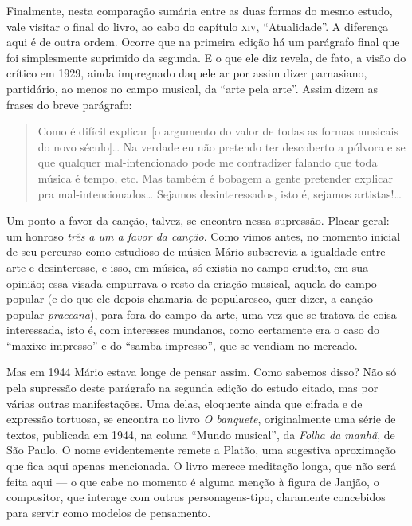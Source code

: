 Finalmente, nesta comparação sumária entre as duas formas do mesmo
estudo, vale visitar o final do livro, ao cabo do capítulo \textsc{xiv},
``Atualidade''. A diferença aqui é de outra ordem. Ocorre que na
primeira edição há um parágrafo final que foi simplesmente suprimido da
segunda. E o que ele diz revela, de fato, a visão do crítico em 1929,
ainda impregnado daquele ar por assim dizer parnasiano, partidário, ao
menos no campo musical, da ``arte pela arte''. Assim dizem as frases do
breve parágrafo:

\begin{quote}
Como é difícil explicar {[}o argumento do valor de todas as formas
musicais do novo século{]}\ldots{} Na verdade eu não pretendo ter descoberto
a pólvora e se que qualquer mal-intencionado pode me contradizer falando
que toda música é tempo, etc. Mas também é bobagem a gente pretender
explicar pra mal-intencionados\ldots{} Sejamos desinteressados, isto é,
sejamos artistas!\ldots{}
\end{quote}

Um ponto a favor da canção, talvez, se encontra nessa supressão. Placar
geral: um honroso \textit{três a um a favor da canção}. Como vimos antes, no momento
inicial de seu percurso como estudioso de música Mário subscrevia a
igualdade entre arte e desinteresse, e isso, em música, só existia no
campo erudito, em sua opinião; essa visada empurrava o resto da criação
musical, aquela do campo popular (e do que ele depois chamaria de
popularesco, quer dizer, a canção popular \textit{praceana}), para fora do
campo da arte, uma vez que se tratava de coisa interessada, isto é, com
interesses mundanos, como certamente era o caso do ``maxixe impresso'' e
do ``samba impresso'', que se vendiam no mercado.

Mas em 1944 Mário estava longe de pensar assim. Como sabemos disso? Não só
pela supressão deste parágrafo na segunda edição do estudo citado, mas
por várias outras manifestações. Uma delas, eloquente ainda que cifrada
e de expressão tortuosa, se encontra no livro \textit{O banquete},
originalmente uma série de textos, publicada em 1944, na coluna ``Mundo
musical'', da \textit{Folha da manhã}, de São Paulo. O nome evidentemente
remete a Platão, uma sugestiva aproximação que fica aqui apenas
mencionada. O livro merece meditação longa, que não será feita aqui --- o
que cabe no momento é alguma menção à figura de Janjão, o compositor,
que interage com outros personagens-tipo, claramente concebidos para
servir como modelos de pensamento.

